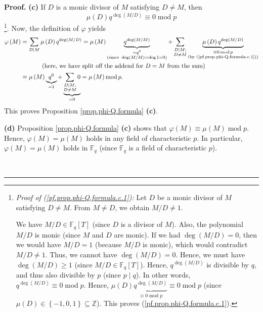 \documentclass[numbers=enddot,12pt,final,onecolumn,notitlepage]{scrartcl}%
\theoremstyle{definition}
\newenvironment{proof}[1][Proof]{\noindent\textbf{#1.} }{\ \rule{0.5em}{0.5em}}
\let\sumnonlimits\sum
\renewcommand{\sum}{\sumnonlimits\limits}
\begin{document}
\begin{proof}
\textbf{(c)} If $D$ is a monic divisor of $M$ satisfying $D\neq M$, then
\begin{equation}
\mu\left(  D\right)  q^{\deg\left(  M/D\right)  }\equiv0\operatorname{mod}p
\label{pf.prop.phi-Q.formula.c.1}%
\end{equation}
\footnote{\textit{Proof of (\ref{pf.prop.phi-Q.formula.c.1}):} Let $D$ be a
monic divisor of $M$ satisfying $D\neq M$. From $M\neq D$, we obtain
$M/D\neq1$.
\par
We have $M/D\in\mathbb{F}_{q}\left[  T\right]  $ (since $D$ is a divisor of
$M$). Also, the polynomial $M/D$ is monic (since $M$ and $D$ are monic). If we
had $\deg\left(  M/D\right)  =0$, then we would have $M/D=1$ (because $M/D$ is
monic), which would contradict $M/D\neq1$. Thus, we cannot have $\deg\left(
M/D\right)  =0$. Hence, we must have $\deg\left(  M/D\right)  \geq1$ (since
$M/D\in\mathbb{F}_{q}\left[  T\right]  $). Hence, $q^{\deg\left(  M/D\right)
}$ is divisible by $q$, and thus also divisible by $p$ (since $p\mid q$). In
other words, $q^{\deg\left(  M/D\right)  }\equiv0\operatorname{mod}p$. Hence,
$\mu\left(  D\right)  \underbrace{q^{\deg\left(  M/D\right)  }}_{\equiv
0\operatorname{mod}p}\equiv0\operatorname{mod}p$ (since $\mu\left(  D\right)
\in\left\{  -1,0,1\right\}  \subseteq\mathbb{Z}$). This proves
(\ref{pf.prop.phi-Q.formula.c.1}).}. Now, the definition of $\varphi$ yields%
\begin{align*}
\varphi\left(  M\right)   &  =\sum\limits_{D\mid M}\mu\left(  D\right)
q^{\deg\left(  M/D\right)  }=\mu\left(  M\right)  \underbrace{q^{\deg\left(
M/M\right)  }}_{\substack{=q^{0}\\\text{(since }\deg\left(  M/M\right)
=\deg1=0\text{)}}}+\sum\limits_{\substack{D\mid M;\\D\neq M}}\underbrace{\mu
\left(  D\right)  q^{\deg\left(  M/D\right)  }}_{\substack{\equiv
0\operatorname{mod}p\\\text{(by (\ref{pf.prop.phi-Q.formula.c.1}))}}}\\
&  \ \ \ \ \ \ \ \ \ \ \left(  \text{here, we have split off the addend for
}D=M\text{ from the sum}\right) \\
&  \equiv\mu\left(  M\right)  \underbrace{q^{0}}_{=1}+\underbrace{\sum
\limits_{\substack{D\mid M;\\D\neq M}}0}_{=0}=\mu\left(  M\right)
\operatorname{mod}p.
\end{align*}
This proves Proposition \ref{prop.phi-Q.formula} \textbf{(c)}.

\textbf{(d)} Proposition \ref{prop.phi-Q.formula} \textbf{(c)} shows that
$\varphi\left(  M\right)  \equiv\mu\left(  M\right)  \operatorname{mod}p$.
Hence, $\varphi\left(  M\right)  =\mu\left(  M\right)  $ holds in any field of
characteristic $p$. In particular, $\varphi\left(  M\right)  =\mu\left(
M\right)  $ holds in $\mathbb{F}_{q}$ (since $\mathbb{F}_{q}$ is a field of
characteristic $p$).


\end{proof}
\end{document}
